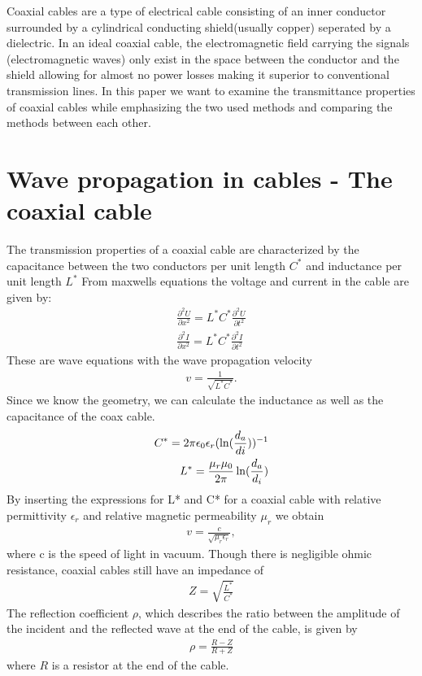 \documentclass[a4paper,10pt,twocolumn]{article}
\begin{document}
    Coaxial cables are a type of electrical cable consisting of an inner conductor surrounded by a cylindrical conducting shield(usually copper) seperated by a dielectric. 
    In an ideal coaxial cable, the electromagnetic field carrying the signals (electromagnetic waves) only exist in the space between the conductor and the shield allowing for almost no power losses making it superior to conventional
    transmission lines.
    In this paper we want to examine the transmittance properties of coaxial cables while emphasizing the two used methods and comparing the methods between each other.
    
    \section{Wave propagation in cables - The coaxial cable}
    The transmission properties of a coaxial cable are characterized by the capacitance between the two conductors per unit length $C^*$ and inductance per unit length $L^*$
    From maxwells equations the voltage and current in the cable are given by:
    \begin{align*}
        \frac{\partial^2U}{\partial x^2}=L^*C^*\frac{\partial^2U}{\partial t^2}\\
        \frac{\partial^2I}{\partial x^2}=L^*C^*\frac{\partial^2I}{\partial t^2}
    \end{align*}
    These are wave equations with the wave propagation velocity
    \begin{align}
        \label{coaxial:vel}
        v = \frac{1}{\sqrt{L^*C^*}}.
    \end{align}
    Since we know the geometry, we can calculate the inductance as well as the capacitance of the coax cable.
    \begin{align}
        C^* = 2\pi\epsilon_0\epsilon_r (\ln(\frac{d_a}{di}))^{-1}\endline
        L^* = \frac{\mu_r\mu_0}{2\pi}\ln(\frac{d_a}{d_i})
        \end{align}
    By inserting the expressions for L* and C* for a coaxial cable with relative permittivity $\epsilon_r$ and relative magnetic permeability $\mu_r$ we obtain
    \begin{align}
        \label{eq:vavePropagationVelocity}
        v = \frac{c}{\sqrt{\mu_r\epsilon_r}},
    \end{align}
    where c is the speed of light in vacuum.
    Though there is negligible ohmic resistance, coaxial cables still have an impedance of
    \begin{align}
        Z=\sqrt{\frac{L^*}{C^*}}
    \end{align}
    The reflection coefficient $\rho$, which describes the ratio between the amplitude of the incident and the reflected wave at the end of the cable, is given by
    \begin{align}
        \label{eq:coaxRef}
        \rho=\frac{R-Z}{R+Z}
    \end{align}
    where $R$ is a resistor at the end of the cable.
\end{document}
